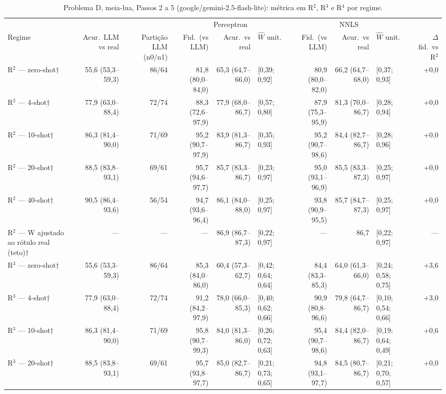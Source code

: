\begin{table}[htbp]
\centering
\footnotesize
\caption{Problema D, meia-lua, Passos 2 a 5 (google/gemini-2.5-flash-lite): métrica em R$^2$, R$^3$ e R$^4$ por regime.}
\label{tab:D_passos_2_a_5_flashlite}
\begin{tabular}{lrrrrlrrlr}
\toprule
 &  &  & \multicolumn{3}{c}{Perceptron} & \multicolumn{3}{c}{NNLS} &  \\ \cmidrule(lr){4-6} \cmidrule(lr){7-9}
Regime & Acur.\ LLM vs real & Partição LLM (n0/n1) & Fid.\ (vs LLM) & Acur.\ vs real & $\hat{W}$ unit. & Fid.\ (vs LLM) & Acur.\ vs real & $\hat{W}$ unit. & $\Delta$ fid.\ vs R$^2$ \\
\midrule
R$^2$ — zero-shot† & 55,6 (53,3–59,3) & 86/64 & 81,8 (80,0–84,0) & 65,3 (64,7–66,0) & [0,39; 0,92] & 80,9 (80,0–82,0) & 66,2 (64,7–68,0) & [0,37; 0,93] & +0,0 \\
R$^2$ — 4-shot† & 77,9 (63,0–88,4) & 72/74 & 88,3 (72,6–97,9) & 77,9 (68,0–86,7) & [0,57; 0,80] & 87,9 (75,3–95,9) & 81,3 (70,0–86,7) & [0,28; 0,94] & +0,0 \\
R$^2$ — 10-shot† & 86,3 (81,4–90,0) & 71/69 & 95,2 (90,7–97,9) & 83,9 (81,3–86,7) & [0,35; 0,93] & 95,2 (90,7–98,6) & 84,4 (82,7–86,7) & [0,28; 0,96] & +0,0 \\
R$^2$ — 20-shot† & 88,5 (83,8–93,1) & 69/61 & 95,7 (94,6–97,7) & 85,7 (83,3–86,7) & [0,23; 0,97] & 95,0 (93,1–96,9) & 85,5 (83,3–87,3) & [0,25; 0,97] & +0,0 \\
R$^2$ — 40-shot† & 90,5 (86,4–93,6) & 56/54 & 94,7 (93,6–96,4) & 86,1 (84,0–88,0) & [0,25; 0,97] & 93,8 (90,9–95,5) & 85,7 (84,7–87,3) & [0,25; 0,97] & +0,0 \\
R$^2$ — W ajustado ao rótulo real (teto)† & — & — & — & 86,9 (86,7–87,3) & [0,22; 0,97] & — & 86,7 & [0,22; 0,97] & — \\
\midrule
R$^3$ — zero-shot† & 55,6 (53,3–59,3) & 86/64 & 85,3 (84,0–86,0) & 60,4 (57,3–62,7) & [0,42; 0,64; 0,64] & 84,4 (83,3–85,3) & 64,0 (61,3–66,0) & [0,24; 0,58; 0,75] & +3,6 \\
R$^3$ — 4-shot† & 77,9 (63,0–88,4) & 72/74 & 91,2 (84,2–97,9) & 78,0 (66,0–85,3) & [0,40; 0,62; 0,66] & 90,9 (80,8–96,6) & 79,8 (64,7–86,7) & [0,10; 0,54; 0,66] & +3,0 \\
R$^3$ — 10-shot† & 86,3 (81,4–90,0) & 71/69 & 95,8 (90,7–99,3) & 84,0 (81,3–86,0) & [0,26; 0,72; 0,63] & 95,4 (90,7–98,6) & 84,4 (82,0–86,7) & [0,19; 0,64; 0,49] & +0,6 \\
R$^3$ — 20-shot† & 88,5 (83,8–93,1) & 69/61 & 95,7 (93,8–97,7) & 85,0 (82,7–86,7) & [0,21; 0,73; 0,65] & 94,8 (93,1–97,7) & 84,5 (80,7–86,7) & [0,21; 0,70; 0,57] & +0,0 \\

\end{tabular}
\end{table}
